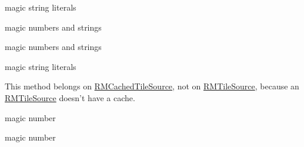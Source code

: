 \begin{DoxyRefList}
magic string literals  
\item[\label{bug__bug000045}%
\hypertarget{bug__bug000045}{}%
成员 \hyperlink{category_r_m_tile_cache_07_configuration_08_a1d899346330d2b6cd99962edf1bb33d6}{\mbox{[}R\-M\-Tile\-Cache(Configuration) new\-Memory\-Cache\-With\-Config\-:\mbox{]}} ]magic numbers and strings  
\item[\label{bug__bug000045}%
\hypertarget{bug__bug000045}{}%
成员 \hyperlink{category_r_m_tile_cache_07_configuration_08_a1d899346330d2b6cd99962edf1bb33d6}{\mbox{[}R\-M\-Tile\-Cache(Configuration) new\-Memory\-Cache\-With\-Config\-:\mbox{]}} ]magic numbers and strings  
\item[\label{bug__bug000049}%
\hypertarget{bug__bug000049}{}%
成员 \hyperlink{interface_r_m_tiled_layer_controller_aece5748f795a9354647832035eebec78}{\mbox{[}R\-M\-Tiled\-Layer\-Controller draw\-Layer\-:in\-Context\-:\mbox{]}} ]magic string literals  
\item[\label{bug__bug000052}%
\hypertarget{bug__bug000052}{}%
成员 \hyperlink{protocol_r_m_tile_source-p_aa5c4555fb2500e5826d5558985d4ee3c}{\mbox{[}R\-M\-Tile\-Source-\/p remove\-All\-Cached\-Images\mbox{]}} ]This method belongs on \hyperlink{interface_r_m_cached_tile_source}{R\-M\-Cached\-Tile\-Source}, not on \hyperlink{protocol_r_m_tile_source-p}{R\-M\-Tile\-Source}, because an \hyperlink{protocol_r_m_tile_source-p}{R\-M\-Tile\-Source} doesn't have a cache.  
\item[\label{bug__bug000053}%
\hypertarget{bug__bug000053}{}%
成员 \hyperlink{interface_r_m_web_tile_image_a3655e0f544330485431e9058851c4716}{\mbox{[}R\-M\-Web\-Tile\-Image connection\-:did\-Receive\-Response\-:\mbox{]}} ]magic number 

magic number 


\end{DoxyRefList}
